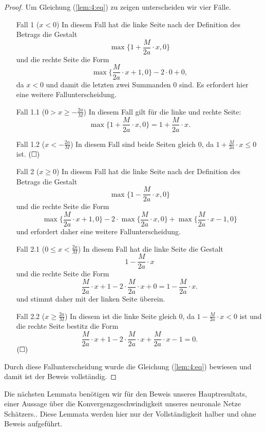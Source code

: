\begin{proof}
Um Gleichung (\ref{lem:4:eq}) zu zeigen unterscheiden wir vier Fälle.
  \begin{itemize}
  \item[Fall 1] ($x < 0$) In diesem Fall hat die linke Seite nach der Definition des Betrags die Gestalt $$\max\{1 + \frac{M}{2a} \cdot x, 0\}$$ und die rechte Seite die Form $$\max\{\frac{M}{2a} \cdot x + 1, 0\} - 2 \cdot 0 + 0,$$ da $x < 0$ und damit die letzten zwei Summanden 0 sind. Es erfordert hier eine weitere Fallunterscheidung.
 \item[Fall 1.1] ($0 > x \geq -\frac{2a}{M}$) In diesem Fall gilt für die linke und rechte Seite:
 $$\max\{1 + \frac{M}{2a} \cdot x, 0\} = 1 + \frac{M}{2a} \cdot x.$$
 \item[Fall 1.2] ($x < -\frac{2a}{M}$) In diesem Fall sind beide Seiten gleich 0, da $1 + \frac{M}{2a} \cdot x \leq 0$ ist. $\hfill(\square)$
  \item[Fall 2] ($x \geq 0$) In diesem Fall hat die linke Seite nach der Definition des Betrags die Gestalt $$\max\{1 - \frac{M}{2a} \cdot x, 0\}$$ und die rechte Seite die Form $$\max\{\frac{M}{2a} \cdot x + 1, 0\} - 2 \cdot \max\{\frac{M}{2a} \cdot x, 0\} + \max\{\frac{M}{2a} \cdot x - 1, 0\}$$ und erfordert daher eine weitere Fallunterscheidung.
 \item[Fall 2.1] ($0 \leq x < \frac{2a}{M}$) In diesem Fall hat die linke Seite die Gestalt $$1 - \frac{M}{2a} \cdot x$$ und die rechte Seite die Form $$\frac{M}{2a} \cdot x + 1 - 2 \cdot \frac{M}{2a} \cdot x + 0 = 1 - \frac{M}{2a} \cdot x.$$ und stimmt daher mit der linken Seite überein.
 \item[Fall 2.2] ($x \geq \frac{2a}{M}$) In diesem ist die linke Seite gleich 0, da $1 - \frac{M}{2a} \cdot x < 0$ ist und die rechte Seite bestitz die Form $$\frac{M}{2a} \cdot x + 1 - 2 \cdot \frac{M}{2a} \cdot x + \frac{M}{2a} \cdot x - 1 = 0.$$ $\hfill(\square)$
\end{itemize} 
Durch diese Fallunterscheidung wurde die Gleichung (\ref{lem:4:eq}) bewiesen und damit ist der Beweis vollständig.
  \end{proof}
Die nächsten Lemmata benötigen wir für den Beweis unseres Hauptresultats, einer Aussage über die Konvergenzgeschwindigkeit unseres neuronale Netze Schätzers.. Diese Lemmata werden hier nur der Vollständigkeit halber und ohne Beweis aufgeführt.

